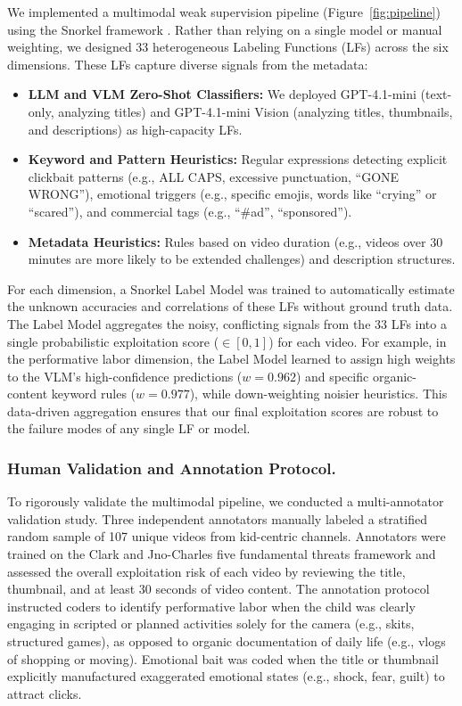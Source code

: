 \documentclass[letterpaper]{article} %
\begin{document}
We implemented a multimodal weak supervision pipeline (Figure~\ref{fig:pipeline}) using the Snorkel framework \citep{ratner2017snorkel}. Rather than relying on a single model or manual weighting, we designed 33 heterogeneous Labeling Functions (LFs) across the six dimensions. These LFs capture diverse signals from the metadata:
\begin{itemize}
    \item \textbf{LLM and VLM Zero-Shot Classifiers:} We deployed GPT-4.1-mini (text-only, analyzing titles) and GPT-4.1-mini Vision (analyzing titles, thumbnails, and descriptions) as high-capacity LFs.
    \item \textbf{Keyword and Pattern Heuristics:} Regular expressions detecting explicit clickbait patterns (e.g., ALL CAPS, excessive punctuation, ``GONE WRONG''), emotional triggers (e.g., specific emojis, words like ``crying'' or ``scared''), and commercial tags (e.g., ``\#ad'', ``sponsored'').
    \item \textbf{Metadata Heuristics:} Rules based on video duration (e.g., videos over 30 minutes are more likely to be extended challenges) and description structures.
\end{itemize}

For each dimension, a Snorkel Label Model was trained to automatically estimate the unknown accuracies and correlations of these LFs without ground truth data. The Label Model aggregates the noisy, conflicting signals from the 33 LFs into a single probabilistic exploitation score ($\in [0, 1]$) for each video. For example, in the performative labor dimension, the Label Model learned to assign high weights to the VLM's high-confidence predictions ($w=0.962$) and specific organic-content keyword rules ($w=0.977$), while down-weighting noisier heuristics. This data-driven aggregation ensures that our final exploitation scores are robust to the failure modes of any single LF or model.

\subsubsection{Human Validation and Annotation Protocol.}

To rigorously validate the multimodal pipeline, we conducted a multi-annotator validation study. Three independent annotators manually labeled a stratified random sample of 107 unique videos from kid-centric channels. Annotators were trained on the Clark and Jno-Charles \citep{clark2025child} five fundamental threats framework and assessed the overall exploitation risk of each video by reviewing the title, thumbnail, and at least 30 seconds of video content. The annotation protocol instructed coders to identify performative labor when the child was clearly engaging in scripted or planned activities solely for the camera (e.g., skits, structured games), as opposed to organic documentation of daily life (e.g., vlogs of shopping or moving). Emotional bait was coded when the title or thumbnail explicitly manufactured exaggerated emotional states (e.g., shock, fear, guilt) to attract clicks.
\end{document}
